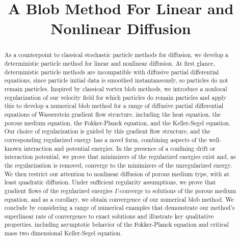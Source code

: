 \documentclass[11pt,leqno]{amsart}
\title{A Blob Method For Linear and Nonlinear Diffusion}
\theoremstyle{definition}
\begin{document}
\maketitle 

\tableofcontents
 
\begin{abstract}
As a counterpoint to classical stochastic particle methods for diffusion, we develop a deterministic particle method for linear and nonlinear diffusion. At first glance, deterministic particle methods are incompatible with diffusive partial differential equations, since particle initial data is smoothed instantaneously, so particles do not remain particles. Inspired by classical vortex blob methods, we introduce a nonlocal regularization of our velocity field for which particles do remain particles and apply this to develop a numerical blob method for a range of diffusive partial differential equations of Wasserstein gradient flow structure, including the heat equation, the porous medium equation, the Fokker-Planck equation, and the Keller-Segel equation. Our choice of regularization is guided by this gradient flow structure, and the corresponding regularized energy has a novel form, combining aspects of the well-known interaction and potential energies.
In the presence of a confining drift or interaction potential, we prove that minimizers of the regularized energies exist and, as the regularization is removed, converge to the minimizers of the unregularized energy. We then restrict our attention to nonlinear diffusion of porous medium type, with at least quadratic diffusion. Under sufficient regularity assumptions, we prove that gradient flows of the regularized energies $\Gamma$-converge to solutions of the porous medium equation, and as a corollary, we obtain convergence of our numerical blob method. We conclude by considering a range of numerical examples that demonstrate our method's superlinear rate of convergence to exact solutions and illustrate key qualitative properties, including asymptotic behavior of the Fokker-Planck equation and critical mass two dimensional Keller-Segel equation.




\end{abstract}
\end{document}
